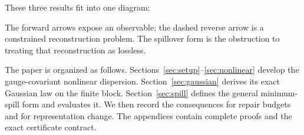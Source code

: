 These three results fit into one diagram:
\begin{center}
\end{center}
The forward arrows expose an observable; the dashed reverse arrow is a
constrained reconstruction problem.  The spillover form is the obstruction
to treating that reconstruction as lossless.

The paper is organized as follows.  Sections~\ref{sec:setup}--\ref{sec:nonlinear}
develop the gauge-covariant nonlinear dispersion.  Section~\ref{sec:gaussian}
derives its exact Gaussian law on the finite block.  Section~\ref{sec:spill}
defines the general minimum-spill form and evaluates it.  We then record the
consequences for repair budgets and for representation change.  The
appendices contain complete proofs and the exact certificate contract.

